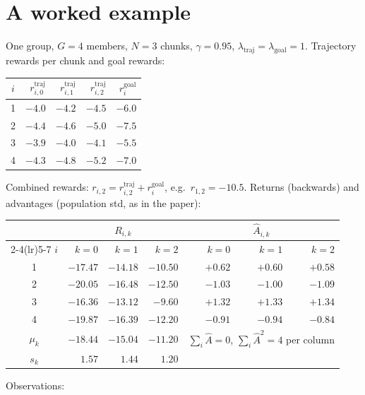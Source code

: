 \documentclass[11pt,a4paper]{article}
\newcommand{\Ah}{\hat A}
\theoremstyle{remark}
\begin{document}
\section{A worked example}
\label{app:toy}
One group, $G=4$ members, $N=3$ chunks, $\gamma=0.95$, $\lambda_{\mathrm{traj}}=\lambda_{\mathrm{goal}}=1$. Trajectory rewards per chunk and goal rewards:
\begin{center}
\small
\begin{tabular}{@{}c rrr r@{}}
\toprule
$i$ & $r^{\mathrm{traj}}_{i,0}$ & $r^{\mathrm{traj}}_{i,1}$ & $r^{\mathrm{traj}}_{i,2}$ & $r^{\mathrm{goal}}_i$\\
\midrule
1 & $-4.0$ & $-4.2$ & $-4.5$ & $-6.0$\\
2 & $-4.4$ & $-4.6$ & $-5.0$ & $-7.5$\\
3 & $-3.9$ & $-4.0$ & $-4.1$ & $-5.5$\\
4 & $-4.3$ & $-4.8$ & $-5.2$ & $-7.0$\\
\bottomrule
\end{tabular}
\end{center}
Combined rewards: $r_{i,2}=r^{\mathrm{traj}}_{i,2}+r^{\mathrm{goal}}_i$, e.g.\ $r_{1,2}=-10.5$. Returns (backwards) and advantages (population std, as in the paper):
\begin{center}
\small
\begin{tabular}{@{}c rrr rrr@{}}
\toprule
& \multicolumn{3}{c}{$R_{i,k}$} & \multicolumn{3}{c}{$\Ah_{i,k}$}\\
\cmidrule(lr){2-4}\cmidrule(lr){5-7}
$i$ & $k=0$ & $k=1$ & $k=2$ & $k=0$ & $k=1$ & $k=2$\\
\midrule
1 & $-17.47$ & $-14.18$ & $-10.50$ & $+0.62$ & $+0.60$ & $+0.58$\\
2 & $-20.05$ & $-16.48$ & $-12.50$ & $-1.03$ & $-1.00$ & $-1.09$\\
3 & $-16.36$ & $-13.12$ & $-9.60$ & $+1.32$ & $+1.33$ & $+1.34$\\
4 & $-19.87$ & $-16.39$ & $-12.20$ & $-0.91$ & $-0.94$ & $-0.84$\\
\midrule
$\mu_k$ & $-18.44$ & $-15.04$ & $-11.20$ & \multicolumn{3}{c}{$\sum_i\Ah=0$, $\sum_i\Ah^2=4$ per column}\\
$s_k$ & $1.57$ & $1.44$ & $1.20$ & & &\\
\bottomrule
\end{tabular}
\end{center}
Observations:
\end{document}
